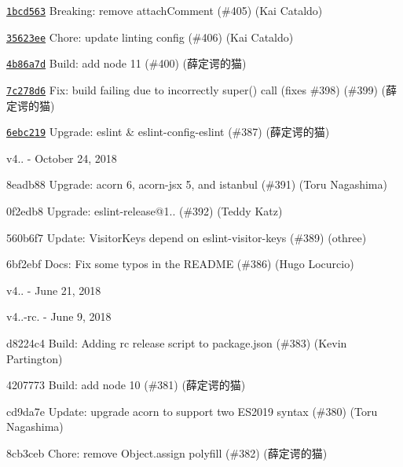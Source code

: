 \begin{DoxyItemize}
\item \href{https://github.com/eslint/espree/commit/1bcd563d4eb4b4032d2662cc5ccd3bfd841b39d7}{\texttt{ {\ttfamily 1bcd563}}} Breaking\+: remove attach\+Comment (\#405) (Kai Cataldo)
\item \href{https://github.com/eslint/espree/commit/35623ee07289c9199eef8b735c97cb3d3d08d5b8}{\texttt{ {\ttfamily 35623ee}}} Chore\+: update linting config (\#406) (Kai Cataldo)
\item \href{https://github.com/eslint/espree/commit/4b86a7dc7c447c11bb6530e46dc43428ce2bd372}{\texttt{ {\ttfamily 4b86a7d}}} Build\+: add node 11 (\#400) (薛定谔的猫)
\item \href{https://github.com/eslint/espree/commit/7c278d6acc6b5db86b803d0cd21b830deb6f569e}{\texttt{ {\ttfamily 7c278d6}}} Fix\+: build failing due to incorrectly super() call (fixes \#398) (\#399) (薛定谔的猫)
\item \href{https://github.com/eslint/espree/commit/6ebc21947166399a0b4918d4a1beb9d610650336}{\texttt{ {\ttfamily 6ebc219}}} Upgrade\+: eslint \& eslint-\/config-\/eslint (\#387) (薛定谔的猫)
\end{DoxyItemize}

v4.. -\/ October 24, 2018


\begin{DoxyItemize}
\item 8eadb88 Upgrade\+: acorn 6, acorn-\/jsx 5, and istanbul (\#391) (Toru Nagashima)
\item 0f2edb8 Upgrade\+: eslint-\/release@1.. (\#392) (Teddy Katz)
\item 560b6f7 Update\+: Visitor\+Keys depend on eslint-\/visitor-\/keys (\#389) (othree)
\item 6bf2ebf Docs\+: Fix some typos in the R\+E\+A\+D\+ME (\#386) (Hugo Locurcio)
\end{DoxyItemize}

v4.. -\/ June 21, 2018

v4..-\/rc. -\/ June 9, 2018


\begin{DoxyItemize}
\item d8224c4 Build\+: Adding rc release script to package.\+json (\#383) (Kevin Partington)
\item 4207773 Build\+: add node 10 (\#381) (薛定谔的猫)
\item cd9da7e Update\+: upgrade acorn to support two E\+S2019 syntax (\#380) (Toru Nagashima)
\item 8cb3ceb Chore\+: remove Object.\+assign polyfill (\#382) (薛定谔的猫)
\end{DoxyItemize}

